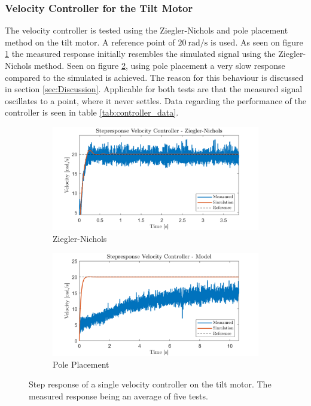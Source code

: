 \documentclass[../../main.tex]{subfiles}
\begin{document}
\subsubsection*{Velocity Controller for the Tilt Motor}
The velocity controller is tested using the Ziegler-Nichols and pole placement method on the tilt motor. A reference point of $\SI{20}{\mathrm{rad}/\second}$ is used. As seen on figure \ref{fig:StepVelZN} the measured response initially resembles the simulated signal using the Ziegler-Nichols method. Seen on figure \ref{fig:StepVelModel}, using pole placement a very slow response compared to the simulated is achieved. The reason for this behaviour is discussed in section \ref{sec:Discussion}. Applicable for both tests are that the measured signal oscillates to a point, where it never settles. Data regarding the performance of the controller is seen in table \ref{tab:controller_data}.

\begin{figure}[h]
     \centering
     \begin{subfigure}[b]{0.49\textwidth}
         \centering
         \includegraphics[width=\textwidth]{Sections/Test/Images/StepVelocityZN.png}
         \caption{Ziegler-Nichols}
         \label{fig:StepVelZN}
     \end{subfigure}
     \hfill
     \begin{subfigure}[b]{0.49\textwidth}
         \centering
         \includegraphics[width=\textwidth]{Sections/Test/Images/StepVelocityModel.png}
         \caption{Pole Placement}
         \label{fig:StepVelModel}
     \end{subfigure}
        \caption{Step response of a single velocity controller on the tilt motor. The measured response being an average of five tests.}
        \label{fig:VelocityTilt}
\end{figure}
\end{document}
